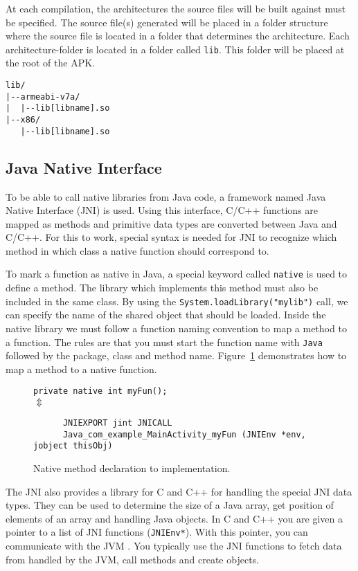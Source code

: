 At each compilation, the architectures the source files will be built against must be specified. The source file(s) generated will be placed in a folder structure where the source file is located in a folder that determines the architecture. Each architecture-folder is located in a folder called \texttt{lib}. This folder will be placed at the root of the APK.

\begin{verbatim}
lib/
|--armeabi-v7a/
|  |--lib[libname].so
|--x86/
   |--lib[libname].so
\end{verbatim}


\subsection{Java Native Interface}
To be able to call native libraries from Java code, a framework named Java Native Interface (JNI) is used. Using this interface, C/C++ functions are mapped as methods and primitive data types are converted between Java and C/C++. For this to work, special syntax is needed for JNI to recognize which method in which class a native function should correspond to.

To mark a function as native in Java, a special keyword called \texttt{native} is used to define a method. The library which implements this method must also be included in the same class. By using the \texttt{System.loadLibrary("mylib")} call, we can specify the name of the shared object that should be loaded. Inside the native library we must follow a function naming convention to map a method to a function. The rules are that you must start the function name with \texttt{Java} followed by the package, class and method name. Figure~\ref{fig:native} demonstrates how to map a method to a native function.

\begin{figure}[H]
\begin{center}
    \texttt{private native int myFun();}\\
    $\Updownarrow$
    \begin{verbatim}
      JNIEXPORT jint JNICALL
      Java_com_example_MainActivity_myFun (JNIEnv *env, jobject thisObj)
    \end{verbatim}
\end{center}
\caption{Native method declaration to implementation.}
\label{fig:native}
\end{figure}

The JNI also provides a library for C and C++ for handling the special JNI data types. They can be used to determine the size of a Java array, get position of elements of an array and handling Java objects. In C and C++ you are given a pointer to a list of JNI functions (\texttt{JNIEnv*}). With this pointer, you can communicate with the JVM \cite[p.~22]{liang1999java}. You typically use the JNI functions to fetch data from handled by the JVM, call methods and create objects.

